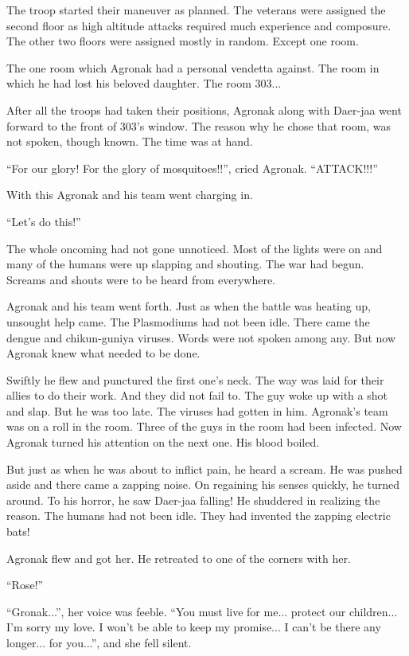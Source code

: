 \documentclass[twoside,11pt,titlepage]{article}
\begin{document}
The troop started their maneuver as planned. The veterans were assigned the second floor as high altitude attacks required much experience and composure. The other two floors were assigned mostly in random. Except one room.

The one room which Agronak had a personal vendetta against. The room in which he had lost his beloved daughter. The room 303...

After all the troops had taken their positions, Agronak along with Daer-jaa went forward to the front of 303's window. The reason why he chose that room, was not spoken, though known. The time was at hand.

``For our glory! For the glory of mosquitoes!!'', cried Agronak. ``ATTACK!!!''

With this Agronak and his team went charging in.

``Let’s do this!''

The whole oncoming had not gone unnoticed. Most of the lights were on and many of the humans were up slapping and shouting. The war had begun. Screams and shouts were to be heard from everywhere.

Agronak and his team went forth. Just as when the battle was heating up, unsought help came. The Plasmodiums had not been idle. There came the dengue and chikun-guniya viruses. Words were not spoken among any. But now Agronak knew what needed to be done.

Swiftly he flew and punctured the first one's neck. The way was laid for their allies to do their work. And they did not fail to. The guy woke up with a shot and slap. But he was too late. The viruses had gotten in him. Agronak's team was on a roll in the room. Three of the guys in the room had been infected. Now Agronak turned his attention on the next one. His blood boiled.

But just as when he was about to inflict pain, he heard a scream. He was pushed aside and there came a zapping noise. On regaining his senses quickly, he turned around. To his horror, he saw Daer-jaa falling! He shuddered in realizing the reason. The humans had not been idle. They had invented the zapping electric bats!

Agronak flew and got her. He retreated to one of the corners with her.

``Rose!''

``Gronak...'', her voice was feeble. ``You must live for me... protect our children... I'm sorry my love. I won't be able to keep my promise... I can't be there any longer... for you...'', and she fell silent.
\end{document}
